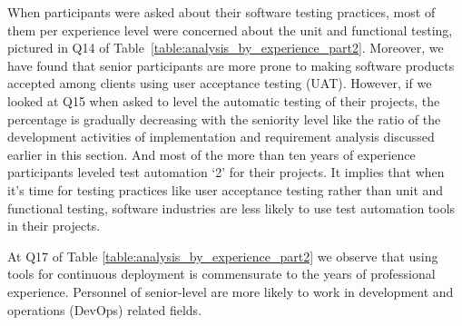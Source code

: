 When participants were asked about their software testing practices, most of them per experience level were concerned about the unit and functional testing, pictured in Q14 of Table~\ref{table:analysis_by_experience_part2}. Moreover, we have found that senior participants are more prone to making software products accepted among clients using user acceptance testing (UAT). However, if we looked at Q15 when asked to level the automatic testing of their projects, the percentage is gradually decreasing with the seniority level like the ratio of the development activities of implementation and requirement analysis discussed earlier in this section. And most of the more than ten years of experience participants leveled test automation `2' for their projects. It implies that when it's time for testing practices like user acceptance testing rather than unit and functional testing, software industries are less likely to use test automation tools in their projects.

At Q17 of Table \ref{table:analysis_by_experience_part2} we observe that using tools for continuous deployment is commensurate to the years of professional experience. Personnel of senior-level are more likely to work in development and operations (DevOps) related fields.